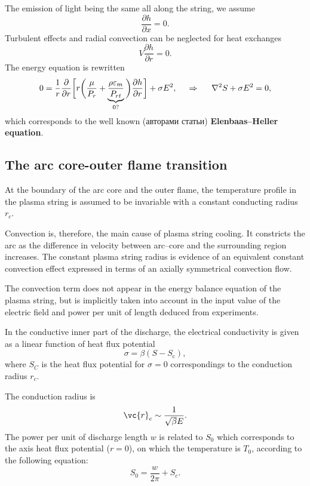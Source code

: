 The emission of light being the same all along the string,
we assume
\begin{equation}
    \frac{\partial h}{\partial x} = 0.
\end{equation}
Turbulent effects and radial convection can be neglected for heat exchanges
\begin{equation}
    V \frac{\partial h}{\partial r} = 0.
\end{equation}
The energy equation is rewritten
\begin{equation}
    0   =
    \frac{1}{r} \frac{\partial }{\partial r} 
    \bigg[
        r \bigg(\frac{\mu}{P_r} + 
        \underbrace{\frac{\rho \varepsilon_m}{P_{rt}}}_{0?}
        \bigg) 
        \frac{\partial h}{\partial r} 
    \bigg] + \sigma E^2,
    \hspace{0.5cm} \Rightarrow \hspace{0.5cm} 
    \nabla^2 S + \sigma E^2 = 0,
\end{equation}
which corresponds to the well known (авторами статьи) \textbf{Elenbaas–Heller equation}.


\subsection{The arc core-outer flame transition}

At the boundary of the arc core and the outer flame, the temperature profile in the plasma string is assumed to be invariable with a constant conducting radius $r_c$.


Convection is, therefore, the main cause of plasma string  cooling. It constricts the arc as the difference in velocity between arc–core and the surrounding region increases. The constant plasma string radius is evidence of an equivalent
constant convection effect expressed in terms of an axially symmetrical convection flow.

The convection term does not appear in the energy balance equation of the plasma string, but is implicitly taken into account in the input value of the electric field and power per unit of length deduced from experiments. 

In the conductive inner part of the discharge, the electrical conductivity is given as a linear function of heat flux potential
\begin{equation}
    \sigma = \beta (S - S_{\text{c}}),
\end{equation}
where $S_C$ is the heat flux potential for $\sigma=0$ correspondings to the conduction radius $r_c$.

 The conduction radius is 
\begin{equation}
    \vc{r}_c \sim \frac{1}{\sqrt{\beta} E} .
\end{equation}
The power per unit of discharge length $w$ is related to $S_0$ which corresponds to the axis heat flux potential ($r=0$), on which the temperature is $T_0$, according to the following equation:
\begin{equation*}
    S_0 = \frac{w}{2\pi} + S_c.
\end{equation*}
